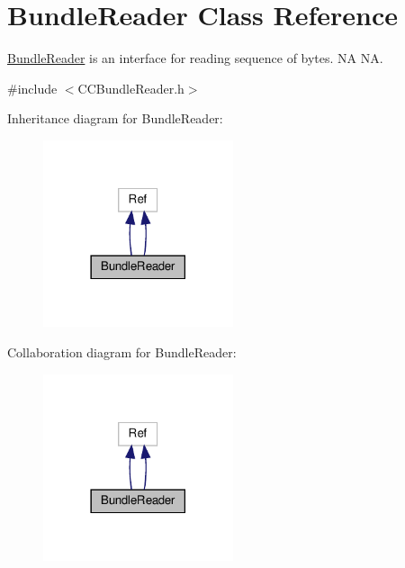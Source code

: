 \hypertarget{classBundleReader}{}\section{Bundle\+Reader Class Reference}
\label{classBundleReader}


\hyperlink{classBundleReader}{Bundle\+Reader} is an interface for reading sequence of bytes.  NA  NA.  




{\ttfamily \#include $<$C\+C\+Bundle\+Reader.\+h$>$}



Inheritance diagram for Bundle\+Reader\+:
\nopagebreak
\begin{figure}[H]
\begin{center}
\leavevmode
\includegraphics[width=158pt]{classBundleReader__inherit__graph}
\end{center}
\end{figure}


Collaboration diagram for Bundle\+Reader\+:
\nopagebreak
\begin{figure}[H]
\begin{center}
\leavevmode
\includegraphics[width=158pt]{classBundleReader__coll__graph}
\end{center}
\end{figure}
